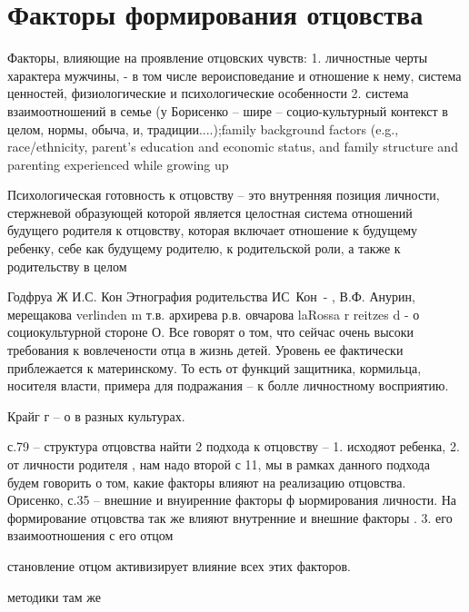 \documentclass{../../common/thesisbyxetex}
\begin{document}
\section{Факторы формирования отцовства}
Факторы, влияющие на проявление отцовских чувств:
1. личностные черты характера мужчины,
- в том числе вероисповедание и отношение к нему, система ценностей, физиологические и 
психологические особенности
2. система взаимоотношений в семье (у Борисенко – шире – социо-культурный контекст в целом, нормы, 
обыча, и, традиции....)\cite{psyot};family background factors (e.g., 
race/ethnicity, parent’s education and economic status, and
family structure and parenting experienced while growing up \cite[164]{long}


Психологическая готовность к отцовству – это внутренняя позиция личности,
стержневой образующей которой является целостная система отношений будущего
родителя к отцовству, которая включает отношение к будущему ребенку, себе как
будущему родителю, к родительской роли, а также к родительству в целом \cite[121]{har}



Годфруа Ж 
И.С. Кон Этнография родительства
ИС Кон -
,
В.Ф. Анурин, мерещакова verlinden m
т.в. архирева
р.в. овчарова
laRossa r reitzes d  - о социокультурной стороне О.
Все говорят о том, что сейчас очень высоки требования к вовлечености отца в жизнь детей. Уровень ее 
фактически приблежается к материнскому. То есть от функций защитника, кормильца, носителя власти, 
примера для подражания – к болле личностному восприятию.

Крайг г – о в разных культурах.



с.79 – структура отцовства
найти
2 подхода к отцовству – 1. исходяот ребенка,
2. от личности родителя \cite[11]{psyot}, нам надо второй
с 11, мы в рамках данного подхода будем говорить о том, какие факторы влияют на реализацию 
отцовства.
Орисенко, с.35 – внешние и внуиренние факторы ф ыормирования личности. На формирование отцовства так 
же влияют внутренние и внешние факторы \cite[35]{psyot}.
3. его взаимоотношения с его отцом \cite[49]{rah}


становление отцом активизирует влияние всех этих факторов.

методики там же




\printbibliography[env=gostbibliography,sorting=ntvy]
\end{document}
